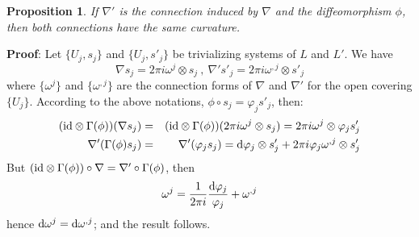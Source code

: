 \documentclass[12pt]{article}
\newtheorem{prop}{Proposition}
\def\beann{\begin{eqnarray*}}
\def\eeann{\end{eqnarray*}}
\def\qed{\ifvmode\removelastskip\fi
{\unskip\nobreak\hfil\penalty50\hbox{}\nobreak\hfil
\hbox{\vrule height1.2ex width1.2ex}\parfillskip=0pt
\finalhyphendemerits=0 \par\smallskip}}
\def\d{{\rm d}}
\begin{document}
\begin{prop}
If $\nabla '$ is the connection induced by
$\nabla$ and the diffeomorphism $\phi$,
then both connections have the same curvature.
\end{prop}
{\bf Proof}: 
Let $\{ U_j,s_j \}$ and $\{ U_j,s'_j \}$ be
trivializing systems of $L$ and $L'$.
We have
$$
\nabla s_j = 2\pi i \omega^j \otimes s_j
\ , \
\nabla ' s'_j = 2\pi i \omega^{,j} \otimes s'_j
$$
where $\{ \omega^j \}$ and $\{ \omega^{,j} \}$
are the connection forms of $\nabla$ and $\nabla '$
for the open covering $\{ U_j \}$.
According to the above notations,
$\phi \circ s_j = \varphi_j s'_j$,
then:
\beann
({\rm id}\otimes \Gamma (\phi))(\nabla s_j)
&=&
({\rm id}\otimes \Gamma (\phi))(2\pi i \omega^j \otimes s_j) =
2\pi i \omega^j \otimes \varphi_j s'_j
\\
\nabla '(\Gamma (\phi)s_j)
&=&
\nabla '(\varphi_j s_j) =
\d \varphi_j \otimes s'_j + 2\pi i \varphi_j \omega^{,j} \otimes s'_j
\eeann
 But $({\rm id}\otimes \Gamma (\phi)) \circ \nabla =
 \nabla '\circ \Gamma (\phi )$, then
$$
\omega^j = \frac{1}{2\pi i}\frac{\d \varphi_j}{\varphi_j} + \omega^{,j}
$$
hence $\d \omega^j = \d \omega^{,j}$; and the result follows.
\qed
\end{document}
